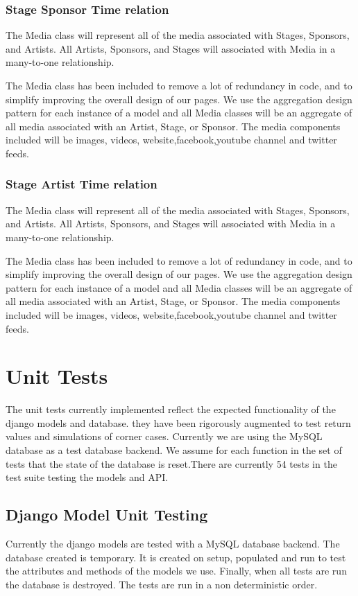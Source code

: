 \documentclass[12pt,english]{scrartcl}
\begin{document}
\subsubsection{Stage Sponsor Time relation}

The Media class will represent all of the media associated with Stages, Sponsors, and Artists. All Artists, Sponsors, and Stages will associated
with Media in a many-to-one relationship.

The Media class has been included to remove a lot of redundancy in code, and to simplify improving the overall 
design of our pages. We use the aggregation design pattern for each instance of a model and all Media classes will be an aggregate of all media
associated with an Artist, Stage, or Sponsor. The media components included will be images, videos, website,facebook,youtube channel and twitter feeds.

\subsubsection{Stage Artist Time relation}

The Media class will represent all of the media associated with Stages, Sponsors, and Artists. All Artists, Sponsors, and Stages will associated
with Media in a many-to-one relationship.

The Media class has been included to remove a lot of redundancy in code, and to simplify improving the overall 
design of our pages. We use the aggregation design pattern for each instance of a model and all Media classes will be an aggregate of all media
associated with an Artist, Stage, or Sponsor. The media components included will be images, videos, website,facebook,youtube channel and twitter feeds.

\section{Unit Tests}

The unit tests currently implemented reflect the expected functionality of the django models and database. they have been rigorously
augmented to test return values and simulations of corner cases. Currently we are using the MySQL database as a test database backend. 
We assume for each function in the set of tests that the state of the database is reset.There are currently 54 tests in the test suite testing the models and API.

\subsection{Django Model Unit Testing}
Currently the django models are tested with a MySQL database backend. The database created is temporary. It is created on setup, populated 
and run to test the attributes and methods of the models we use. Finally, when all tests are run the database is destroyed.
The tests are run in a non deterministic order. 
\end{document}

